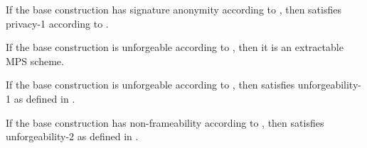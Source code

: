 \begin{theorem}
  If the base \CUASGen construction has signature anonymity according to
  , then \CUASMPS satisfies privacy-1
  according to \cite{ngsy22}.
\end{theorem}

\begin{theorem}
  If the base \CUASGen construction is unforgeable according to
  , then it is an extractable MPS scheme.
\end{theorem}

\begin{theorem}
  If the base \CUASGen construction is unforgeable according to
  , then \CUASMPS satisfies unforgeability-1 as
  defined in \cite{ngsy22}.
\end{theorem}

\begin{theorem}
  If the base \CUASGen construction has non-frameability according to
  , then \CUASMPS satisfies unforgeability-2 as
  defined in \cite{ngsy22}.
\end{theorem}

